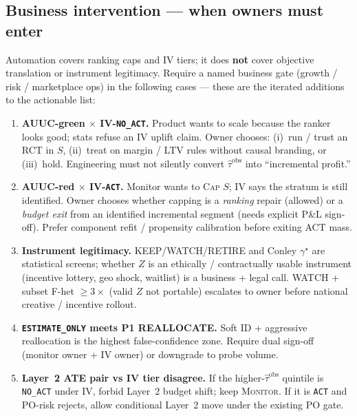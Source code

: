\subsection{Business intervention --- when owners must enter}
\label{sec:business-gate}

Automation covers ranking caps and IV tiers; it does \textbf{not} cover
objective translation or instrument legitimacy.
Require a named business gate (growth / risk / marketplace ops) in the
following cases --- these are the iterated additions to the actionable
list:

\begin{enumerate}\itemsep3pt
  \item[\textbf{B1.}] \textbf{AUUC-green $\times$ IV-\texttt{NO\_ACT}.}
        Product wants to scale because the ranker looks good; stats refuse
        an IV uplift claim.
        Owner chooses: (i)~run / trust an RCT in $S$, (ii)~treat on
        margin / LTV rules without causal branding, or (iii)~hold.
        Engineering must not silently convert $\widehat{\tau}^{\mathrm{obs}}$
        into ``incremental profit.''

  \item[\textbf{B2.}] \textbf{AUUC-red $\times$ IV-\texttt{ACT}.}
        Monitor wants to \textsc{Cap} $S$; IV says the stratum is still
        identified.
        Owner chooses whether capping is a \emph{ranking} repair (allowed)
        or a \emph{budget exit} from an identified incremental segment
        (needs explicit P\&L sign-off). Prefer component refit /
        propensity calibration before exiting ACT mass.

  \item[\textbf{B3.}] \textbf{Instrument legitimacy.}
        KEEP/WATCH/RETIRE and Conley $\gamma^\star$ are statistical screens;
        whether $Z$ is an ethically / contractually usable instrument
        (incentive lottery, geo shock, waitlist) is a business + legal
        call. WATCH + subset F-het $\ge 3\times$ (valid $Z$ not portable)
        escalates to owner before national creative / incentive rollout.

  \item[\textbf{B4.}] \textbf{\texttt{ESTIMATE\_ONLY} meets P1 REALLOCATE.}
        Soft ID + aggressive reallocation is the highest false-confidence
        zone. Require dual sign-off (monitor owner + IV owner) or downgrade
        to probe volume.

  \item[\textbf{B5.}] \textbf{Layer~2 ATE pair vs IV tier disagree.}
        If the higher-$\widehat{\tau}^{\mathrm{obs}}$ quintile is
        \texttt{NO\_ACT} under IV, forbid Layer~2 budget shift; keep
        \textsc{Monitor}. If it is \texttt{ACT} and PO-risk rejects, allow
        conditional Layer~2 move under the existing PO gate.
\end{enumerate}

